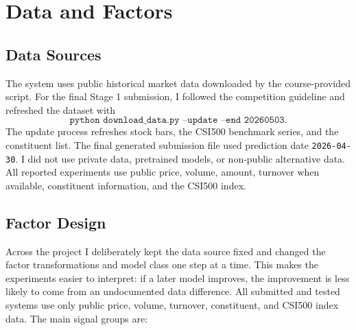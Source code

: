 \documentclass[11pt]{article}
\begin{document}
\section{Data and Factors}

\subsection{Data Sources}

The system uses public historical market data downloaded by the course-provided
script. For the final Stage 1 submission, I followed the competition guideline
and refreshed the dataset with
\[
    \texttt{python download\_data.py --update --end 20260503}.
\]
The update process refreshes stock bars, the CSI500 benchmark series, and the
constituent list. The final generated submission file used prediction date
\texttt{2026-04-30}. I did not use private data, pretrained models, or
non-public alternative data. All reported experiments use public price,
volume, amount, turnover when available, constituent information, and the
CSI500 index.

\subsection{Factor Design}

Across the project I deliberately kept the data source fixed and changed the
factor transformations and model class one step at a time. This makes the
experiments easier to interpret: if a later model improves, the improvement is
less likely to come from an undocumented data difference. All submitted and
tested systems use only public price, volume, turnover, constituent, and CSI500
index data. The main signal groups are:
\end{document}
